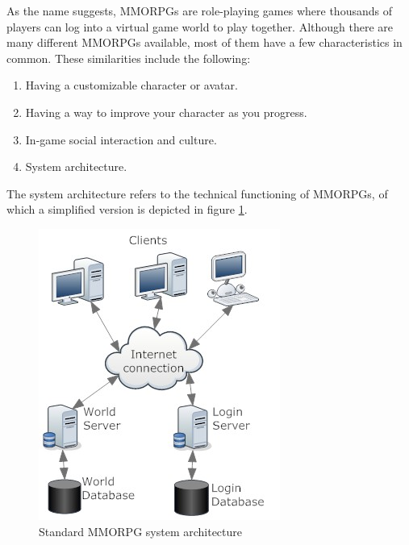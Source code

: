 
As the name suggests, MMORPGs are role-playing games where thousands of players can log into a virtual game world to play together. Although there are many different MMORPGs available, most of them have a few characteristics in common. These similarities include the following: %

\begin{enumerate}
	\item Having a customizable character or avatar.
	\item Having a way to improve your character as you progress.
	\item In-game social interaction and culture.
	\item System architecture.
\end{enumerate}


The system architecture refers to the technical functioning of MMORPGs, of which a simplified version is depicted in figure \ref{architecture}.%

\begin{figure}[htbp]
\centering
\includegraphics[scale = 0.5]{architecture.jpg}
\caption{Standard MMORPG system architecture}
\label{architecture}
\end{figure}

